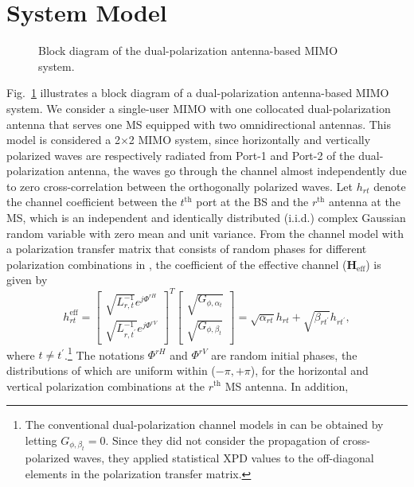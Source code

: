 \documentclass[journal]{IEEEtran}
\begin{document}
\section{System Model}
\begin{figure}[!t]
\caption{Block diagram of the dual-polarization antenna-based MIMO system.}
\label{systemmodel}
\end{figure}
Fig.~\ref{systemmodel} illustrates a block diagram of a dual-polarization antenna-based MIMO system. We consider a single-user MIMO with one collocated dual-polarization antenna that serves one MS equipped with two omnidirectional antennas. This model is considered a 2$\times$2 MIMO system, since horizontally and vertically polarized waves are respectively radiated from Port-1 and Port-2 of the dual-polarization antenna, the waves go through the channel almost independently due to zero cross-correlation between the orthogonally polarized waves\cite{DP_WCM, ManufDP,3DDPchannel}. Let $h_{rt}$ denote the channel coefficient between the $t^\text{th}$ port at the BS and the $r^\text{th}$ antenna at the MS, which is an independent and identically distributed (i.i.d.) complex Gaussian random variable with zero mean and unit variance. From the channel model with a polarization transfer matrix that consists of random phases for different polarization combinations in \cite{3GPP_3DSCM, 3DDPchannel}, the coefficient of the effective channel ($\pmb{H}_{\text{eff}}$) is given by
\begin{equation}
h_{rt}^\text{eff}=\begin{bmatrix}
\sqrt{L_{r,t}^{-1}}e^{j\Phi^{rH}}\\\sqrt{L_{r,t^{\prime}}^{-1}}e^{j\Phi^{rV}}
\end{bmatrix}^T
\begin{bmatrix}
\sqrt{G_{\phi,\alpha_t}}\\ \sqrt{G_{\phi,\beta_t}}
\end{bmatrix}
=\sqrt{\alpha_{rt}}h_{rt}+\sqrt{\beta_{rt^{\prime}}}h_{rt^{\prime}}\nonumber,
\end{equation}
where $t\neq t^\prime$.\footnote{The conventional dual-polarization channel models in \cite{DP_WCM, DPchannel, DPchannel2} can be obtained by letting $G_{\phi,{\beta_t}}=0$. Since they did not consider the propagation of cross-polarized waves, they applied statistical XPD values to the off-diagonal elements in the polarization transfer matrix.} The notations $\Phi^{rH}$ and $\Phi^{rV}$ are random initial phases, the distributions of which are uniform within ($-\pi,  +\pi$), for the horizontal and vertical polarization combinations at the $r^\text{th}$ MS antenna. In addition, 
\end{document}
